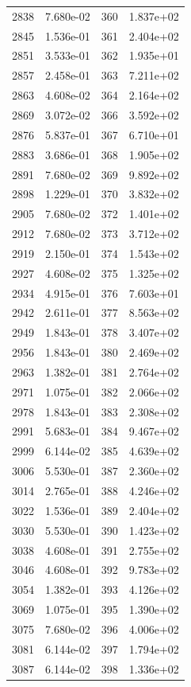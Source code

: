 \documentclass[12pt]{article}
\begin{document}
\begin{longtable}{@{}cccc@{}}
2838 & 7.680e-02 & 360 & 1.837e+02 \\
2845 & 1.536e-01 & 361 & 2.404e+02 \\
2851 & 3.533e-01 & 362 & 1.935e+01 \\
2857 & 2.458e-01 & 363 & 7.211e+02 \\
2863 & 4.608e-02 & 364 & 2.164e+02 \\
2869 & 3.072e-02 & 366 & 3.592e+02 \\
2876 & 5.837e-01 & 367 & 6.710e+01 \\
2883 & 3.686e-01 & 368 & 1.905e+02 \\
2891 & 7.680e-02 & 369 & 9.892e+02 \\
2898 & 1.229e-01 & 370 & 3.832e+02 \\
2905 & 7.680e-02 & 372 & 1.401e+02 \\
2912 & 7.680e-02 & 373 & 3.712e+02 \\
2919 & 2.150e-01 & 374 & 1.543e+02 \\
2927 & 4.608e-02 & 375 & 1.325e+02 \\
2934 & 4.915e-01 & 376 & 7.603e+01 \\
2942 & 2.611e-01 & 377 & 8.563e+02 \\
2949 & 1.843e-01 & 378 & 3.407e+02 \\
2956 & 1.843e-01 & 380 & 2.469e+02 \\
2963 & 1.382e-01 & 381 & 2.764e+02 \\
2971 & 1.075e-01 & 382 & 2.066e+02 \\
2978 & 1.843e-01 & 383 & 2.308e+02 \\
2991 & 5.683e-01 & 384 & 9.467e+02 \\
2999 & 6.144e-02 & 385 & 4.639e+02 \\
3006 & 5.530e-01 & 387 & 2.360e+02 \\
3014 & 2.765e-01 & 388 & 4.246e+02 \\
3022 & 1.536e-01 & 389 & 2.404e+02 \\
3030 & 5.530e-01 & 390 & 1.423e+02 \\
3038 & 4.608e-01 & 391 & 2.755e+02 \\
3046 & 4.608e-01 & 392 & 9.783e+02 \\
3054 & 1.382e-01 & 393 & 4.126e+02 \\
3069 & 1.075e-01 & 395 & 1.390e+02 \\
3075 & 7.680e-02 & 396 & 4.006e+02 \\
3081 & 6.144e-02 & 397 & 1.794e+02 \\
3087 & 6.144e-02 & 398 & 1.336e+02 \\

\end{longtable}
\end{document}
